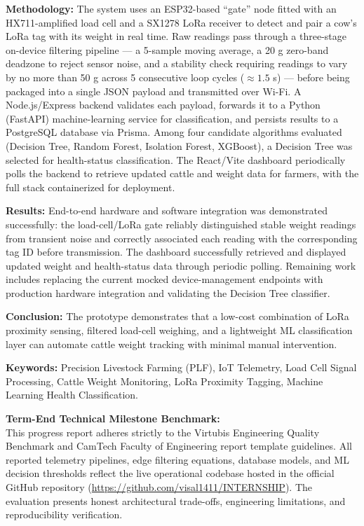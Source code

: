 \documentclass[11pt,a4paper]{report}
\begin{document}
\vspace{0.3cm}
\noindent\textbf{Methodology:} The system uses an ESP32-based ``gate'' node fitted with an HX711-amplified load cell and a SX1278 LoRa receiver to detect and pair a cow's LoRa tag with its weight in real time. Raw readings pass through a three-stage on-device filtering pipeline --- a 5-sample moving average, a 20 g zero-band deadzone to reject sensor noise, and a stability check requiring readings to vary by no more than 50 g across 5 consecutive loop cycles ($\approx 1.5$ s) --- before being packaged into a single JSON payload and transmitted over Wi-Fi. A Node.js/Express backend validates each payload, forwards it to a Python (FastAPI) machine-learning service for classification, and persists results to a PostgreSQL database via Prisma. Among four candidate algorithms evaluated (Decision Tree, Random Forest, Isolation Forest, XGBoost), a Decision Tree was selected for health-status classification. The React/Vite dashboard periodically polls the backend to retrieve updated cattle and weight data for farmers, with the full stack containerized for deployment.

\vspace{0.3cm}
\noindent\textbf{Results:} End-to-end hardware and software integration was demonstrated successfully: the load-cell/LoRa gate reliably distinguished stable weight readings from transient noise and correctly associated each reading with the corresponding tag ID before transmission. The dashboard successfully retrieved and displayed updated weight and health-status data through periodic polling. Remaining work includes replacing the current mocked device-management endpoints with production hardware integration and validating the Decision Tree classifier.

\vspace{0.3cm}
\noindent\textbf{Conclusion:} The prototype demonstrates that a low-cost combination of LoRa proximity sensing, filtered load-cell weighing, and a lightweight ML classification layer can automate cattle weight tracking with minimal manual intervention.

\vspace{0.6cm}
\noindent\textbf{Keywords:} Precision Livestock Farming (PLF), IoT Telemetry, Load Cell Signal Processing, Cattle Weight Monitoring, LoRa Proximity Tagging, Machine Learning Health Classification.

\vspace{0.8cm}
\begin{writingguidance}
\small
\textbf{Term-End Technical Milestone Benchmark:}\\[2pt]
This progress report adheres strictly to the Virtubis Engineering Quality Benchmark and CamTech Faculty of Engineering report template guidelines. All reported telemetry pipelines, edge filtering equations, database models, and ML decision thresholds reflect the live operational codebase hosted in the official GitHub repository (\url{https://github.com/visal1411/INTERNSHIP}). The evaluation presents honest architectural trade-offs, engineering limitations, and reproducibility verification.
\end{writingguidance}
\end{document}
